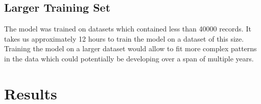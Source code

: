 \subsection{Larger Training Set}
The model was trained on datasets which contained less than 40000 records. It takes us approximately 12 hours to train the model on a dataset of this size. Training the model on a larger dataset would allow to fit more complex patterns in the data which could potentially be developing over a span of multiple years.
\section{Results}

